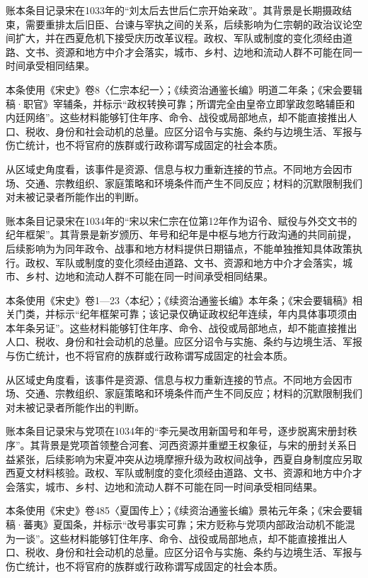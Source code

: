 账本条目记录宋在1033年的“刘太后去世后仁宗开始亲政”。其背景是长期摄政结束，需要重排太后旧臣、台谏与宰执之间的关系，后续影响为仁宗朝的政治议论空间扩大，并在西夏危机下接受庆历改革议程。政权、军队或制度的变化须经由道路、文书、资源和地方中介才会落实，城市、乡村、边地和流动人群不可能在同一时间承受相同结果。

本条使用《宋史》卷8〈仁宗本纪一〉；《续资治通鉴长编》明道二年条；《宋会要辑稿·职官》宰辅条，并标示“政权转换可靠；所谓完全由皇帝立即掌政忽略辅臣和内廷网络”。这些材料能够钉住年序、命令、战役或局部地点，却不能直接推出人口、税收、身份和社会动机的总量。应区分诏令与实施、条约与边境生活、军报与伤亡统计，也不将官府的族群或行政称谓写成固定的社会本质。

从区域史角度看，该事件是资源、信息与权力重新连接的节点。不同地方会因市场、交通、宗教组织、家庭策略和环境条件而产生不同反应；材料的沉默限制我们对未被记录者所能作出的判断。

账本条目记录宋在1034年的“宋以宋仁宗在位第12年作为诏令、赋役与外交文书的纪年框架”。其背景是新岁颁历、年号和纪年是中枢与地方行政沟通的共同前提，后续影响为为同年政令、战事和地方材料提供日期锚点，不能单独推知具体政策执行。政权、军队或制度的变化须经由道路、文书、资源和地方中介才会落实，城市、乡村、边地和流动人群不可能在同一时间承受相同结果。

本条使用《宋史》卷1—23〈本纪〉；《续资治通鉴长编》本年条；《宋会要辑稿》相关门类，并标示“纪年框架可靠；该记录仅确证政权纪年连续，年内具体事项须由本年条另证”。这些材料能够钉住年序、命令、战役或局部地点，却不能直接推出人口、税收、身份和社会动机的总量。应区分诏令与实施、条约与边境生活、军报与伤亡统计，也不将官府的族群或行政称谓写成固定的社会本质。

从区域史角度看，该事件是资源、信息与权力重新连接的节点。不同地方会因市场、交通、宗教组织、家庭策略和环境条件而产生不同反应；材料的沉默限制我们对未被记录者所能作出的判断。

账本条目记录宋与党项在1034年的“李元昊改用新国号和年号，逐步脱离宋册封秩序”。其背景是党项首领整合河套、河西资源并重塑王权象征，与宋的册封关系日益紧张，后续影响为宋夏冲突从边境摩擦升级为政权间战争，西夏自身制度应另取西夏文材料核验。政权、军队或制度的变化须经由道路、文书、资源和地方中介才会落实，城市、乡村、边地和流动人群不可能在同一时间承受相同结果。

本条使用《宋史》卷485〈夏国传上〉；《续资治通鉴长编》景祐元年条；《宋会要辑稿·蕃夷》夏国条，并标示“改号事实可靠；宋方贬称与党项内部政治动机不能混为一谈”。这些材料能够钉住年序、命令、战役或局部地点，却不能直接推出人口、税收、身份和社会动机的总量。应区分诏令与实施、条约与边境生活、军报与伤亡统计，也不将官府的族群或行政称谓写成固定的社会本质。

